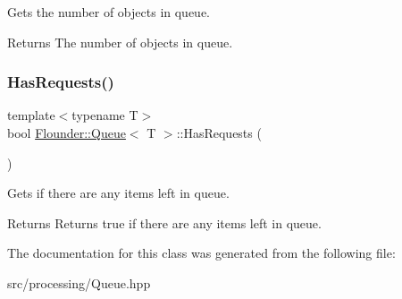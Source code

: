 Gets the number of objects in queue. 

\begin{DoxyReturn}{Returns}
The number of objects in queue. 
\end{DoxyReturn}
\mbox{\label{class_flounder_1_1_queue_a2c6e4d8630275ee76355685a5fe0d150}} 
\subsubsection{\texorpdfstring{Has\+Requests()}{HasRequests()}}
{\footnotesize\ttfamily template$<$typename T$>$ \\
bool \hyperlink{class_flounder_1_1_queue}{Flounder\+::\+Queue}$<$ T $>$\+::Has\+Requests (\begin{DoxyParamCaption}{ }\end{DoxyParamCaption})\hspace{0.3cm}{\ttfamily [inline]}}



Gets if there are any items left in queue. 

\begin{DoxyReturn}{Returns}
Returns true if there are any items left in queue. 
\end{DoxyReturn}


The documentation for this class was generated from the following file\+:\begin{DoxyCompactItemize}
\item 
src/processing/Queue.\+hpp\end{DoxyCompactItemize}
